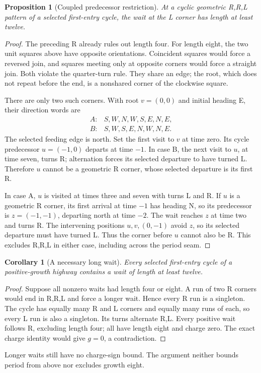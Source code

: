 \documentclass[11pt,letterpaper]{article}
\newtheorem{proposition}[theorem]{Proposition}
\newtheorem{corollary}[theorem]{Corollary}
\begin{document}
\begin{proposition}[Coupled predecessor restriction]
At a cyclic geometric R,R,L pattern of a selected first-entry cycle,
the wait at the L corner has length at least twelve.
\end{proposition}
\begin{proof}
The preceding R already rules out length four. For length eight, the
two unit squares above have opposite orientations. Coincident squares
would force a reversed join, and squares meeting only at opposite
corners would force a straight join. Both violate the quarter-turn
rule. They share an edge; the root, which does not repeat before the
end, is a nonshared corner of the clockwise square.

There are only two such corners. With root $v=(0,0)$ and initial
heading E, their direction words are
\[
\begin{array}{ll}
A:&S,W,N,W,S,E,N,E,\\
B:&S,W,S,E,N,W,N,E.
\end{array}
\]
The selected feeding edge is north. Set the first visit to $v$ at
time zero. Its cycle predecessor $u=(-1,0)$ departs at time $-1$.
In case B, the next visit to $u$, at time seven, turns R; alternation
forces its selected departure to have turned L. Therefore $u$ cannot
be a geometric R corner, whose selected departure is its first R.

In case A, $u$ is visited at times three and seven with turns L and R.
If $u$ is a geometric R corner, its first arrival at time $-1$ has
heading N, so its predecessor is $z=(-1,-1)$, departing north at
time $-2$. The wait reaches $z$ at time two and turns R. The intervening
positions $u,v,(0,-1)$ avoid $z$, so its selected departure must
have turned L. Thus the corner before $u$ cannot also be R.
This excludes R,R,L in either case, including across the period seam.
\end{proof}

\begin{corollary}[A necessary long wait]
Every selected first-entry cycle of a positive-growth highway contains
a wait of length at least twelve.
\end{corollary}
\begin{proof}
Suppose all nonzero waits had length four or eight. A run of two R
corners would end in R,R,L and force a longer wait. Hence every R run
is a singleton. The cycle has equally many R and L corners and equally
many runs of each, so every L run is also a singleton. Its turns
alternate R,L. Every positive wait follows R, excluding length four;
all have length eight and charge zero. The exact charge identity
would give $g=0$, a contradiction.
\end{proof}
Longer waits still have no charge-sign bound. The argument neither bounds
period from above nor excludes growth eight.
\end{document}
